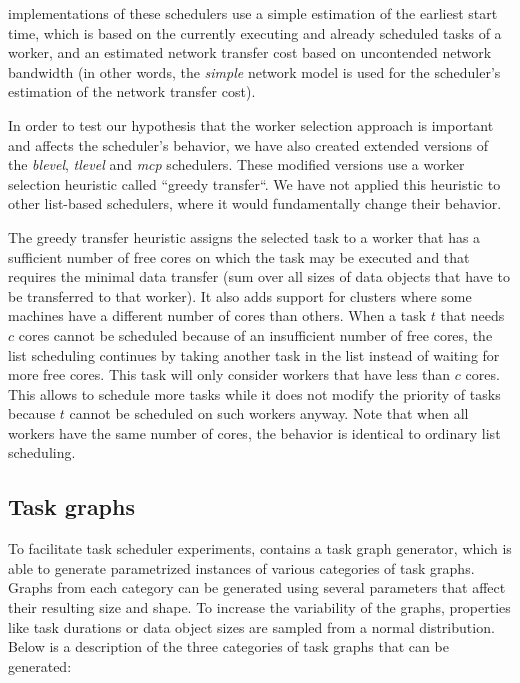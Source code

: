 \estee{} implementations of these schedulers use a simple estimation of the earliest
start time, which is based on the currently executing and already scheduled tasks of a worker, and
an estimated network transfer cost based on uncontended network bandwidth (in other words, the
\emph{simple} network model is used for the scheduler's estimation of the network
transfer cost).

In order to test our hypothesis that the worker selection approach is important and affects the
scheduler's behavior, we have also created extended versions of the \emph{blevel},
\emph{tlevel} and \emph{mcp} schedulers. These modified versions use a
worker selection heuristic called ``greedy transfer``. We have not applied this heuristic to other
list-based schedulers, where it would fundamentally change their behavior.

The greedy transfer heuristic assigns the selected task to a worker that has a sufficient number of
free cores on which the task may be executed and that requires the minimal data transfer (sum over
all sizes of data objects that have to be transferred to that worker). It also adds support for
clusters where some machines have a different number of cores than others. When a task
$t$ that needs $c$ cores cannot be scheduled because of an
insufficient number of free cores, the list scheduling continues by taking another task in the list
instead of waiting for more free cores. This task will only consider workers that have less than
$c$ cores. This allows to schedule more tasks while it does not modify the
priority of tasks because $t$ cannot be scheduled on such workers anyway. Note
that when all workers have the same number of cores, the behavior is identical to ordinary list
scheduling.

\subsection{Task graphs}
To facilitate task scheduler experiments, \estee{} contains a task graph generator,
which is able to generate parametrized instances of various categories of task graphs. Graphs from
each category can be generated using several parameters that affect their resulting size and shape.
To increase the variability of the graphs, properties like task durations or data object sizes are
sampled from a normal distribution. Below is a description of the three categories of task graphs
that can be generated:

